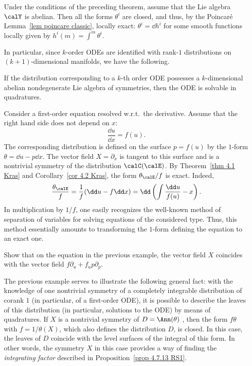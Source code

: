 \begin{cor}\label{cor 4.2 Kras}
    Under the conditions of the preceding theorem, assume that the Lie algebra $\calY$ is abelian. Then all the forms $\theta^i$ are closed, and thus, by the Poincar\'e Lemma~\ref{lem poincare classic}, locally exact: $\theta^i=\dd h^i$ for some smooth functions locally given by $h^i(m)=\int^m\theta^i$.
\end{cor}

In particular, since $k$-order ODEs are identified with rank-$1$ distributions on $(k+1)$-dimensional manifolds, we have the following.

\begin{cor}\label{cor 4.3 Kras}
    If the distribution corresponding to a $k$-th order ODE possesses a $k$-dimensional abelian nondegenerate Lie algebra of symmetries, then the ODE is solvable in quadratures.
\end{cor}

\begin{example}
    Consider a first-order equation resolved w.r.t.\ the derivative. Assume that the right hand side does not depend on $x$:
    \[\frac{\dd u}{\dd x}=f(u).\]
    The corresponding distribution is defined on the surface $p=f(u)$ by the $1$-form $\theta=\dd u-p\dd x$. The vector field $X=\partial_x$ is tangent to this surface and is a nontrivial symmetry of the distribution $\calC(\calE)$. By Theorem~\ref{thm 4.1 Kras} and Corollary~\ref{cor 4.2 Kras}, the form $\theta_\calE\slash f$ is exact. Indeed, 
    \[\frac{\theta_\calE}{f}=\frac{1}{f}(\dd u-f\dd x)=\dd\left(\int \frac{\dd u}{f(u)}-x\right).\]
    In multiplication by $1\slash f$, one easily recognizes the well-known method of separation of variables for solving equations of the considered type. Thus, this method essentially amounts to transforming the $1$-form defining the equation to an exact one.
\end{example}

\begin{xca}
    Show that on the equation in the previous example, the vector field $X$ coincides with the vector field $f\partial_u+f_u p\partial_p$.
\end{xca}

The previous example serves to illustrate the following general fact: with the knowledge of one nontrivial symmetry of a completely integrable distribution of corank $1$ (in particular, of a first-order ODE), it is possible to describe the leaves of this distribution (in particular, solutions to the ODE) by means of quadratures. If $X$ is a nontrivial symmetry of $D=\Ann(\theta)$ , then the form $f\theta$ with $f=1/\theta(X)$, which also defines the distribution $D$, is closed. In this case, the leaves of $D$ coincide with the level surfaces of the integral of this form. In other words, the symmetry $X$ in this case provides a way of finding the \emph{integrating factor} described in Proposition~\ref{prop 4.7.13 RS1}. 

